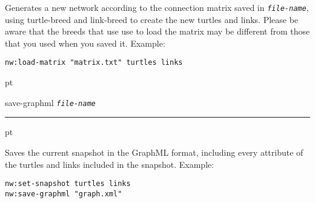 \documentclass[12pt]{article}
\newenvironment{prim}{
  \leftskip 0cm
  \vskip 6 pt
  \ttfamily
  \bfseries
}{
  \hrule
  \vskip 6 pt
}
\newcommand{\param}[1]{\texttt{\textit{\textmd{#1}}}}
\begin{document}
Generates a new network according to the connection matrix saved in
\param{file-name}, using turtle-breed and link-breed to create the new turtles
and links. Please be aware that the breeds that use use to load the matrix may
be different from those that you used when you saved it. Example:

\begin{Verbatim}
nw:load-matrix "matrix.txt" turtles links
\end{Verbatim}

\begin{prim}
save-graphml \param{file-name}
\end{prim}

Saves the current snapshot in the GraphML format, including every attribute of
the turtles and links included in the snapshot. Example:
\begin{Verbatim}
nw:set-snapshot turtles links
nw:save-graphml "graph.xml"
\end{Verbatim}
\end{document}
